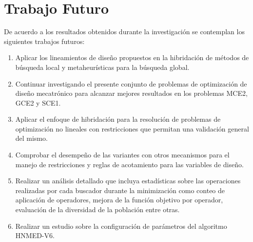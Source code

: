  \section{Trabajo Futuro}
 De acuerdo a los resultados obtenidos durante la investigación se contemplan los siguientes trabajos futuros:
 \begin{enumerate}
    \item Aplicar los lineamientos de diseño propuestos en la hibridación de métodos de búsqueda local y metaheurísticas para la búsqueda global. 
    \item Continuar investigando el presente conjunto de problemas de optimización de diseño mecatrónico para alcanzar mejores resultados en los problemas MCE2, GCE2 y SCE1.
    \item Aplicar el enfoque de hibridación para la resolución de problemas de optimización no lineales con restricciones que permitan una validación general del mismo. 
    \item Comprobar el desempeño de las variantes con otros mecanismos para el manejo de restricciones y reglas de acotamiento para las variables de diseño.
    \item Realizar un análisis detallado que incluya estadísticas sobre las operaciones realizadas por cada buscador durante la minimización como  conteo de aplicación de operadores, mejora de la función objetivo por operador, evaluación de la diversidad de la población entre otras.
    \item Realizar un estudio sobre la configuración de parámetros del algoritmo HNMED-V6.
 \end{enumerate}
 